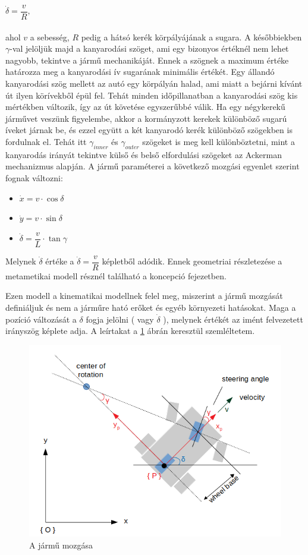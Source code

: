 $\dot{\delta} = \dfrac{v}{R},$ \\\\
ahol $ v $ a sebesség, $ R $ pedig a hátsó kerék körpályájának a sugara. A későbbiekben $ \gamma $-val jelöljük majd a kanyarodási szöget, ami egy bizonyos értéknél nem lehet nagyobb, tekintve a jármű mechanikáját. Ennek a szögnek a maximum értéke határozza meg a kanyarodási ív sugarának minimális értékét. Egy állandó kanyarodási szög mellett az autó egy körpályán halad, ami miatt a bejárni kívánt út ilyen körívekből épül fel. Tehát minden időpillanatban a kanyarodási szög kis mértékben változik, így az út követése egyszerűbbé válik. Ha egy négykerekű járművet veszünk figyelembe, akkor a kormányzott kerekek különböző sugarú íveket járnak be, és ezzel együtt a két kanyarodó kerék különböző szögekben is fordulnak el. Tehát itt $ \gamma_{inner} $  és $ \gamma_{outer} $ szögeket is meg kell különböztetni, mint a kanyarodás irányát tekintve külső és belső elfordulási szögeket az Ackerman mechanizmus alapján. 
A jármű paraméterei a következő mozgási egyenlet szerint fognak változni:
\begin{itemize}
	\item[] $ \dot{x} = v \cdot \cos\delta $
	\item[] $ \dot{y} = v \cdot \sin\delta $
	\item[] $ \dot{\delta} = \dfrac{v}{L} \cdot \tan\gamma $
\end{itemize}

Melynek $ \dot{\delta} $ értéke a $ \dot{\delta} = \dfrac{v}{R} $ képletből adódik. Ennek geometriai részletezése a metametikai modell résznél található a koncepció fejezetben. 

Ezen modell a kinematikai modellnek felel meg, miszerint a jármű mozgását definiáljuk és nem a járműre ható erőket és egyéb környezeti hatásokat. Maga a pozíció változását a $ \delta $ fogja jelölni ( vagy $ \dot{\delta} $ ), melynek értékét az imént felvezetett irányszög képlete adja. A leírtakat a \ref{fig:position} ábrán keresztül szemléltetem.\\

\begin{figure}[h!]
\centering
\includegraphics[scale=0.70]{images/position.png}
\caption{A jármű mozgása}
\label{fig:position}
\end{figure}

